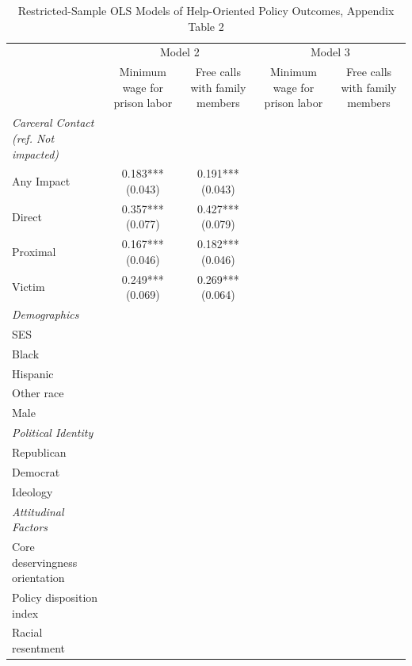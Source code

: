 \begin{table}[!htbp]
\centering
\caption{Restricted-Sample OLS Models of Help-Oriented Policy Outcomes, Appendix Table 2}
\label{tab:appendix\_help\_restricted\_2}
\begin{threeparttable}
\begin{tabular}{lcccc}
\toprule
 & \multicolumn{2}{c}{Model 2} & \multicolumn{2}{c}{Model 3}
 \\
\cmidrule(lr){2-3} \cmidrule(lr){4-5}
 & Minimum wage for prison labor & Free calls with family members & Minimum wage for prison labor & Free calls with family members
 \\
\midrule
\textit{Carceral Contact (ref. Not impacted)} &  &  &  & 
\\
Any Impact & \makecell[c]{0.183*** \\ (0.043)} & \makecell[c]{0.191*** \\ (0.043)} &  &  \\
Direct & \makecell[c]{0.357*** \\ (0.077)} & \makecell[c]{0.427*** \\ (0.079)} &  &  \\
Proximal & \makecell[c]{0.167*** \\ (0.046)} & \makecell[c]{0.182*** \\ (0.046)} &  &  \\
Victim & \makecell[c]{0.249*** \\ (0.069)} & \makecell[c]{0.269*** \\ (0.064)} &  &  \\
\addlinespace
\textit{Demographics} &  &  &  &  \\
SES &  &  &  &  \\
Black &  &  &  &  \\
Hispanic &  &  &  &  \\
Other race &  &  &  &  \\
Male &  &  &  &  \\
\addlinespace
\textit{Political Identity} &  &  &  &  \\
Republican &  &  &  &  \\
Democrat &  &  &  &  \\
Ideology &  &  &  &  \\
\addlinespace
\textit{Attitudinal Factors} &  &  &  &  \\
Core deservingness orientation &  &  &  &  \\
Policy disposition index &  &  &  &  \\
Racial resentment &  &  &  &  \\

\end{tabular}
\end{threeparttable}
\end{table}
